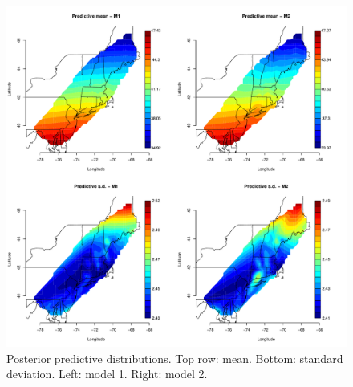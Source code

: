 \documentclass[12pt]{article}
\begin{document}
\begin{figure}[ht]
\begin{center}
\includegraphics[scale=0.5]{figs/y.pdf}
\end{center}
\caption{Posterior predictive distributions. Top row: mean. Bottom: standard deviation. Left: model 1. Right: model 2.}
\end{figure}

% 
\end{document}
